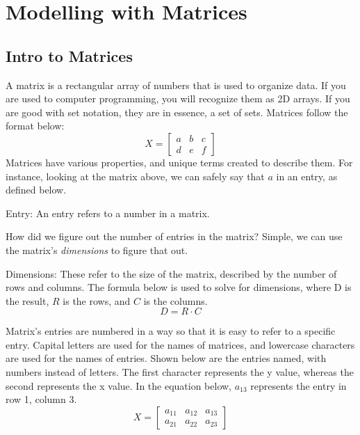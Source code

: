 \section{Modelling with Matrices}
    
    \subsection{Intro to Matrices}
    A matrix is a rectangular array of numbers that is used to organize data.
    If you are used to computer programming, you will recognize them as 2D arrays.
    If you are good with set notation, they are in essence, a set of sets.
    Matrices follow the format below:
    \begin{equation*}
        X =
        \begin{bmatrix}
            a & b & c \\
            d & e & f
        \end{bmatrix}
    \end{equation*}
    Matrices have various properties, and unique terms created to describe them.
    For instance, looking at the matrix above, we can safely say that $a$ in an entry, as defined below.
    \begin{definition}
        Entry: An entry refers to a number in a matrix.
    \end{definition}
    How did we figure out the number of entries in the matrix? Simple, we can use the matrix's \emph{dimensions} to figure that out.
    \begin{definition}Dimensions:
        These refer to the size of the matrix, described by the number of rows and columns.
        The formula below is used to solve for dimensions, where D is the result, $R$ is the rows, and $C$ is the columns.
        \begin{equation*}
                D = R \cdot C
        \end{equation*}
    \end{definition}
    Matrix's entries are numbered in a way so that it is easy to refer to a specific entry.
    Capital letters are used for the names of matrices, and lowercase characters are used for the names of entries.
    Shown below are the entries named, with numbers instead of letters.
    The first character represents the y value, whereas the second represents the x value.
    In the equation below, $a_{13}$ represents the entry in row 1, column 3.
    \begin{equation*}
        X =
        \begin{bmatrix}
            a_{11} & a_{12} & a_{13} \\
            a_{21} & a_{22} & a_{23}
        \end{bmatrix}
    \end{equation*}
        
